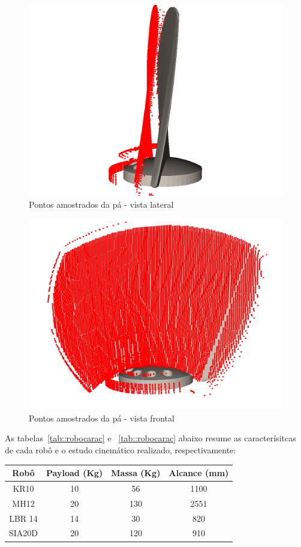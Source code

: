 \begin{figure}[h!]	
	\centering
	\includegraphics[width=0.6\columnwidth]{detail/figs/bighatch/amostrapa1.png}
	\caption{Pontos amostrados da pá - vista lateral}
	\label{fig::amostrapa1}
\end{figure}

\begin{figure}[h!]	
	\centering
	\includegraphics[width=0.6\columnwidth]{detail/figs/bighatch/amostrapa2.png}
	\caption{Pontos amostrados da pá - vista frontal}
	\label{fig::amostrapa2}
\end{figure}

As tabelas~\ref{tab::robocarac} e ~\ref{tab::robocarac} abaixo resume as
caracterísitcas de cada robô e o estudo cinemático realizado, respectivamente:

\begin{center}
\begin{tabular}{  c | c | c | c  }
  \hline
  \textbf{Robô} & \textbf{Payload (Kg)} & \textbf{Massa (Kg)} & \textbf{Alcance
  (mm)} \\ \hline 
  KR10 & 10 & 56 & 1100 \\ \hline
  MH12 & 20 & 130 & 2551  \\ \hline
  LBR 14 & 14 & 30 & 820 \\ \hline
  SIA20D & 20 & 120 &  910 \\
  \hline
\end{tabular}
\label{tab::robocarac}
\end{center}

